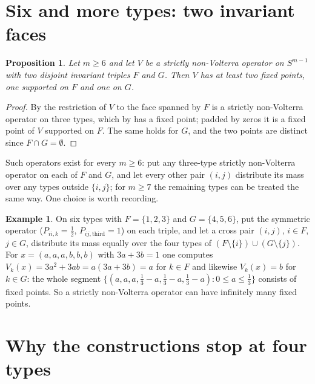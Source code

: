 \documentclass[11pt]{amsart}
\newtheorem{proposition}[theorem]{Proposition}
\theoremstyle{definition}
\newtheorem{example}[theorem]{Example}
\newcommand{\Simp}{S^{m-1}}
\begin{document}
\section{Six and more types: two invariant faces}\label{sec:six}

\begin{proposition}\label{prop:six}
Let $m\ge6$ and let $V$ be a strictly non-Volterra operator on $\Simp$ with two disjoint invariant triples $F$ and $G$. Then $V$ has at least two fixed points, one supported on $F$ and one on $G$.
\end{proposition}

\begin{proof}
By  the restriction of $V$ to the face spanned by $F$ is a strictly non-Volterra operator on three types, which by  has a fixed point; padded by zeros it is a fixed point of $V$ supported on $F$. The same holds for $G$, and the two points are distinct since $F\cap G=\emptyset$.
\end{proof}

Such operators exist for every $m\ge6$: put any three-type strictly non-Volterra operator on each of $F$ and $G$, and let every other pair $(i,j)$ distribute its mass over any types outside $\{i,j\}$; for $m\ge7$ the remaining types can be treated the same way. One choice is worth recording.

\begin{example}\label{ex:segment}
On six types with $F=\{1,2,3\}$ and $G=\{4,5,6\}$, put the symmetric operator ($P_{ii,k}=\frac12$, $P_{ij,\text{third}}=1$) on each triple, and let a cross pair $(i,j)$, $i\in F$, $j\in G$, distribute its mass equally over the four types of $(F\setminus\{i\})\cup(G\setminus\{j\})$. For $x=(a,a,a,b,b,b)$ with $3a+3b=1$ one computes $V_k(x)=3a^2+3ab=a(3a+3b)=a$ for $k\in F$ and likewise $V_k(x)=b$ for $k\in G$: the whole segment $\{(a,a,a,\frac13-a,\frac13-a,\frac13-a):0\le a\le\frac13\}$ consists of fixed points. So a strictly non-Volterra operator can have infinitely many fixed points.
\end{example}

\section{Why the constructions stop at four types}\label{sec:four}
\end{document}
